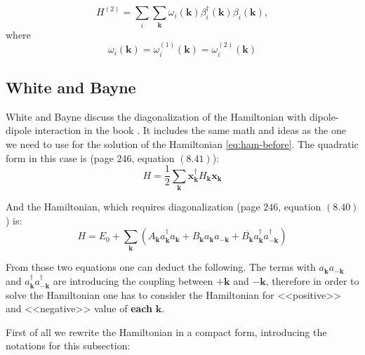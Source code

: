 \documentclass[a4paper,12pt]{article}
\begin{document}
            \begin{equation}
                H^{(2)} = \sum_{i}\sum_{\boldsymbol{k}}\omega_i(\boldsymbol{k})\beta^{\dag}_i(\boldsymbol{k})\beta_i(\boldsymbol{k}),
            \end{equation}
            where
            \begin{equation}
                \omega_i(\boldsymbol{k}) = \omega_i^{(1)}(\boldsymbol{k}) = \omega_i^{(2)}(\boldsymbol{k})
            \end{equation}

        \subsection{White and Bayne}\label{sec:white}
            White and Bayne discuss the diagonalization of the Hamiltonian with dipole-dipole interaction in the book \cite{white1983quantum}. 
            It includes the same math and ideas as the one we need to use for the solution of the Hamiltonian \eqref{eq:ham-before}.
            The quadratic form in this case is (page $246$, equation $(8.41)$):
            \begin{equation}
                H = \dfrac{1}{2} \sum_{\boldsymbol{k}} \boldsymbol{x}^{\dag}_{\boldsymbol{k}} H_{\boldsymbol{k}} \boldsymbol{x}_{\boldsymbol{k}} \label{eq:white-quadratic-form}
            \end{equation}

            And the Hamiltonian, which requires diagonalization (page $246$, equation $(8.40)$) is:
            \begin{equation}
                H = E_0 + \sum_{\boldsymbol{k}} \left(A_{\boldsymbol{k}}a^{\dag}_{\boldsymbol{k}}a_{\boldsymbol{k}} + 
                B_{\boldsymbol{k}}a_{\boldsymbol{k}}a_{-\boldsymbol{k}} + 
                \overline{B_{\boldsymbol{k}}}a^{\dag}_{\boldsymbol{k}}a^{\dag}_{-\boldsymbol{k}}\right)
            \end{equation}

            From those two equations one can deduct the following. The terms with $a_{\boldsymbol{k}}a_{-\boldsymbol{k}}$ 
            and $a^{\dag}_{\boldsymbol{k}}a^{\dag}_{-\boldsymbol{k}}$ are introducing the coupling between $+\boldsymbol{k}$ and $-\boldsymbol{k}$,
            therefore in order to solve the Hamiltonian one has to consider the Hamiltonian for <<positive>> and <<negative>> value of \textbf{each} $\boldsymbol{k}$.
            
            First of all we rewrite the Hamiltonian in a compact form, introducing the notations for this subsection:
\end{document}
